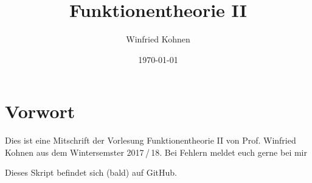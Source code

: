 \documentclass[]{scrbook}
\title{Funktionentheorie II}
\author{Winfried Kohnen}
\date{\today}
\begin{document}
\pagestyle{plain}

\maketitle

\chapter*{Vorwort}

Dies ist eine Mitschrift der Vorlesung Funktionentheorie II von Prof. Winfried Kohnen aus dem Wintersemster 2017\,/\,18.
Bei Fehlern meldet euch gerne bei mir

\begin{center}
\end{center}

Dieses Skript befindet sich (bald) auf GitHub.

\tableofcontents
\clearpage

\setcounter{page}{0}
\pagestyle{fancy}






\end{document}

